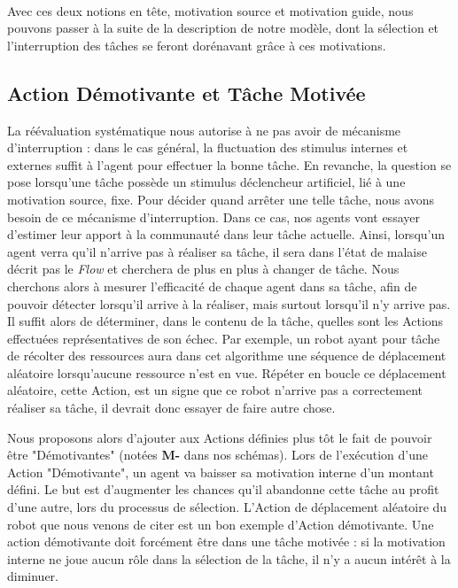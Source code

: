         \paragraph{}
        Avec ces deux notions en tête, motivation source et motivation guide, nous pouvons passer à la suite de la description de notre modèle, dont la sélection et l'interruption des tâches se feront dorénavant grâce à ces motivations.
		\subsection{Action Démotivante et Tâche Motivée}
		
			La réévaluation systématique nous autorise à ne pas avoir de mécanisme d'interruption : dans le cas général, la fluctuation des stimulus internes et externes suffit à l'agent pour effectuer la bonne tâche. En revanche, la question se pose lorsqu'une tâche possède un stimulus déclencheur artificiel, lié à une motivation source, fixe. Pour décider quand arrêter une telle tâche, nous avons besoin de ce mécanisme d'interruption. Dans ce cas, nos agents vont essayer d'estimer leur apport à la communauté dans leur tâche actuelle. Ainsi, lorsqu'un agent verra qu'il n'arrive pas à réaliser sa tâche, il sera dans l'état de malaise décrit pas le \textit{Flow} et cherchera de plus en plus à changer de tâche. Nous cherchons alors à mesurer l'efficacité de chaque agent dans sa tâche, afin de pouvoir détecter lorsqu'il arrive à la réaliser, mais surtout lorsqu'il n'y arrive pas. Il suffit alors de déterminer, dans le contenu de la tâche, quelles sont les Actions effectuées représentatives de son échec. Par exemple, un robot ayant pour tâche de récolter des ressources aura dans cet algorithme une séquence de déplacement aléatoire lorsqu'aucune ressource n'est en vue. Répéter en boucle ce déplacement aléatoire, cette Action, est un signe que ce robot n'arrive pas a correctement réaliser sa tâche, il devrait donc essayer de faire autre chose.
			
			Nous proposons alors d'ajouter aux Actions définies plus tôt le fait de pouvoir être "Démotivantes" (notées \textbf{M-} dans nos schémas). Lors de l'exécution d'une Action "Démotivante", un agent va baisser sa motivation interne d'un montant défini. Le but est d'augmenter les chances qu'il abandonne cette tâche au profit d'une autre, lors du processus de sélection. L'Action de déplacement aléatoire du robot que nous venons de citer est un bon exemple d'Action démotivante. Une action démotivante doit forcément être dans une tâche motivée : si la motivation interne ne joue aucun rôle dans la sélection de la tâche, il n'y a aucun intérêt à la diminuer.
			
